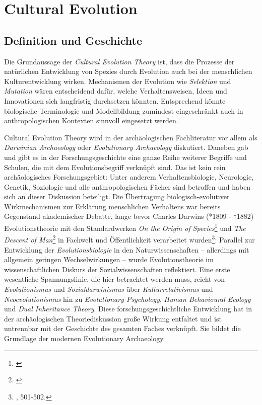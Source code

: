 \documentclass[openany,twoside,twocolumn]{book}
\let\rmarkdownfootnote\footnote%
\def\footnote{\protect\rmarkdownfootnote}
\begin{document}
\hypertarget{cultural-evolution}{%
\chapter{Cultural Evolution}\label{cultural-evolution}}

\hypertarget{definition-und-geschichte}{%
\section{Definition und Geschichte}\label{definition-und-geschichte}}

Die Grundaussage der \emph{Cultural Evolution Theory} ist, dass die
Prozesse der natürlichen Entwicklung von Spezies durch Evolution auch
bei der menschlichen Kulturentwicklung wirken. Mechanismen der Evolution
wie \emph{Selektion} und \emph{Mutation} wären entscheidend dafür,
welche Verhaltensweisen, Ideen und Innovationen sich langfristig
durchsetzen könnten. Entsprechend könnte biologische Terminologie und
Modellbildung zumindest eingeschränkt auch in anthropologischen
Kontexten sinnvoll eingesetzt werden.

Cultural Evolution Theory wird in der archäologischen Fachliteratur vor
allem als \emph{Darwinian Archaeology} oder \emph{Evolutionary
Archaeology} diskutiert. Daneben gab und gibt es in der
Forschungsgeschichte eine ganze Reihe weiterer Begriffe und Schulen, die
mit dem Evolutionsbegriff verknüpft sind. Das ist kein rein
archäologisches Forschungsgebiet: Unter anderem Verhaltensbiologie,
Neurologie, Genetik, Soziologie und alle anthropologischen Fächer sind
betroffen und haben sich an dieser Diskussion beteiligt. Die Übertragung
biologisch-evolutiver Wirkmechanismen zur Erklärung menschlichen
Verhaltens war bereits Gegenstand akademischer Debatte, lange bevor
Charles Darwins (*1809 - †1882) Evolutionstheorie mit den Standardwerken
\emph{On the Origin of Species}\footnote{\textcite{Darwinoriginspeciesmeans1859}}
und \emph{The Descent of Man}\footnote{\textcite{Darwindescentmanselection1871}}
in Fachwelt und Öffentlichkeit verarbeitet wurden\footnote{\textcite{petermann_geschichte_2004},
  501-502.}: Parallel zur Entwicklung der \emph{Evolutionsbiologie} in
den Naturwissenschaften -- allerdings mit allgemein geringen
Wechselwirkungen -- wurde Evolutionstheorie im wissenschaftlichen
Diskurs der Sozialwissenschaften reflektiert. Eine erste wesentliche
Spannungslinie, die hier betrachtet werden muss, reicht von
\emph{Evolutionismus} und \emph{Sozialdarwinismus} über
\emph{Kulturrelativismus} und \emph{Neoevolutionismus} hin zu
\emph{Evolutionary Psychology}, \emph{Human Behavioural Ecology} und
\emph{Dual Inheritance Theory}. Diese forschungsgeschichtliche
Entwicklung hat in der archäologischen Theoriediskussion große Wirkung
entfaltet und ist untrennbar mit der Geschichte des gesamten Faches
verknüpft. Sie bildet die Grundlage der modernen Evolutionary
Archaeology.
\end{document}
